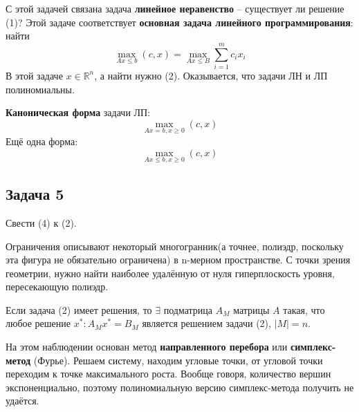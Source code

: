 \documentclass[11pt]{article}
\newcounter{th}\setcounter{th}{0}
\newcounter{stnmt}\setcounter{stnmt}{0}
\def\st{\par\smallskip\refstepcounter{stnmt}\textbf{\arabic{stnmt}}}
\newtheorem*{Statement}{Утверждение \st}
\begin{document}
С этой задачей связана задача \textbf{линейное неравенство} -- существует ли решение (1)?
Этой задаче соответствует \textbf{основная задача линейного программирования}: найти
\begin{equation}
\max_{Ax \leq b}(c, x) = \max_{Ax \leq B}\sum_{i = 1}^mc_ix_i
\end{equation}
В этой задаче $x \in \mathbb{R}^n$, а найти нужно (2).
Оказывается, что задачи ЛН и ЛП полиномиальны.

\textbf{Каноническая форма} задачи ЛП:
\begin{equation}
\max_{Ax = b, x \geq 0}(c, x)
\end{equation}
Ещё одна форма:
\begin{equation}
\max_{Ax \leq b, x \geq 0}(c, x)
\end{equation}
\subsection{Задача 5}
\label{sec:org2624472}
Свести (4) к (2).

Ограничения описывают некоторый многогранник(а точнее, полиэдр, поскольку эта фигура не
обязательно ограничена) в n-мерном пространстве. С точки зрения геометрии, нужно найти
наиболее удалённую от нуля гиперплоскость уровня, пересекающую полиэдр.

\begin{Statement}
Если задача (2) имеет решения, то $\exists$ подматрица $A_M$ матрицы $A$ такая, что любое
решение $x^*: A_Mx^* = B_M$ является решением задачи (2), $|M| = n$.
\end{Statement}
На этом наблюдении основан метод \textbf{направленного перебора} или \textbf{симплекс-метод} (Фурье).
Решаем систему, находим угловые точки, от угловой точки переходим к точке максимального роста.
Вообще говоря, количество вершин экспоненциально, поэтому полиномиальную версию симплекс-метода
получить не удаётся.
\end{document}
